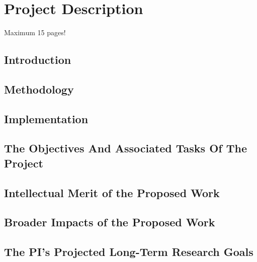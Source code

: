\section{Project Description}
{\color{red} Maximum 15 pages!}


\subsection{Introduction}

\lipsum[6]

\subsection {Methodology}

\lipsum[6]


\subsection{Implementation}

\lipsum[6]




\subsection{The Objectives And Associated Tasks Of The Project}

\lipsum[6]

\subsection{Intellectual Merit of the Proposed Work}

\lipsum[6]




\subsection{Broader Impacts of the Proposed Work}

\lipsum[6]

\subsection{The PI's Projected Long-Term Research Goals}

\lipsum[6]



